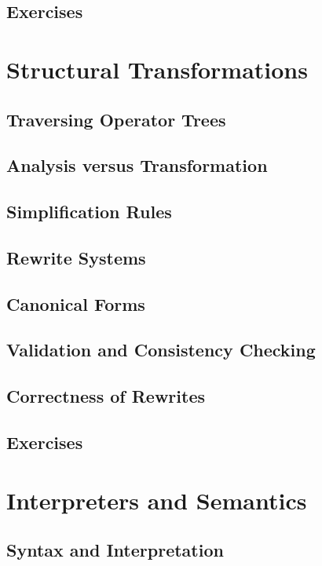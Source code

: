 \documentclass[11pt,a4paper]{article}
\begin{document}
\subsection{Exercises}


\section{Structural Transformations}

\subsection{Traversing Operator Trees}

\subsection{Analysis versus Transformation}

\subsection{Simplification Rules}

\subsection{Rewrite Systems}

\subsection{Canonical Forms}

\subsection{Validation and Consistency Checking}

\subsection{Correctness of Rewrites}

\subsection{Exercises}


\section{Interpreters and Semantics}

\subsection{Syntax and Interpretation}
\end{document}
